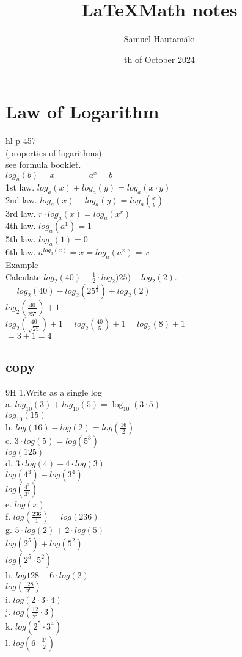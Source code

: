 \documentclass{article}
\title{\LaTeX Math notes}
\author{Samuel Hautamäki}
\date{th of October 2024}
\begin{document}
  \maketitle
   
  \section{Law of Logarithm}
  hl p 457\\
  (properties of logarithms)\\
  see formula booklet.\\
  $log_a(b)=x  ===   a^x=b$\\
  1st law. $log_a(x)+log_a(y)=log_a(x\cdot y)$\\
  2nd law. $log_a(x)-log_a(y)=log_a(\frac{x}{y})$\\
  3rd law. $r\cdot log_a(x)=log_a(x^r)$\\
  4th law. $log_a(a^1)=1$\\
  5th law. $log_a(1)=0$\\
  6th law. $a^{log_a(x)}=x=log_a(a^x)=x$\\
  Example\\
  Calculate $log_2(40)-\frac{1}{2}\cdot log_2)25)+log_2(2)$.\\
  $=log_2(40)-log_2(25^{\frac{1}{2}})+log_2(2)$\\
  $log_2(\frac{40}{25^{\frac{1}{2}}})+1$\\
  $log_2(\frac{40}{\sqrt{25}})+1=log_2(\frac{40}{5})+1=log_2(8)+1$\\
  $=3+1=4$\\
  \subsection{copy}
  9H 1.Write as a single log\\
  a. $log_{10}(3)+log_{10}(5)=\log_{10}(3\cdot5)$\\
  $log_{10}(15)$\\
  b. $log(16)-log(2)=log(\frac{16}{2})$\\
  c. $3\cdot log(5)=log(5^3)$\\
  $log(125)$\\
  d. $3\cdot log(4)-4\cdot log(3)$\\
  $log(4^3)-log(3^4)$\\
  $log(\frac{4^3}{3^4})$\\
  e. $log(x)$\\
  f. $log(\frac{236}{1})=log(236)$\\
  g. $5\cdot log(2)+2\cdot log(5)$\\
  $log(2^5)+log(5^2)$\\
  $log(2^5\cdot5^2)$\\
  h. $log 128 - 6\cdot log(2)$\\
  $log(\frac{128}{2^6})$\\
  i. $log(2\cdot3\cdot4)$\\
  j. $log(\frac{12}{2^2}\cdot3)$\\
  k. $log(2^5\cdot3^4)$\\
  l. $log(6\cdot\frac{3^3}{2})$\\


  

   
\end{document}
